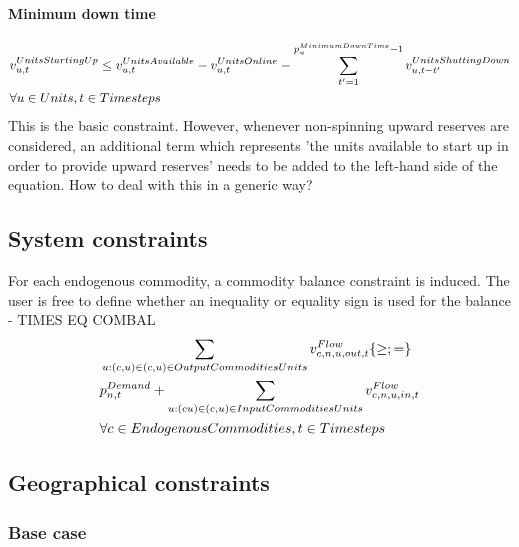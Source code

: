 \paragraph{Minimum down time}
\begin{align} \label{eq:minimumdowntime}
&\vUnitsStartingUp \le \vUnitsAvailable - \vUnitsOnline - \sum_{\timestep'=1}^{\pMinimumDownTime - 1} \vUnitsShuttingDown[\unit,\timestep-\timestep'] \nonumber \\
& \forall \units, \timesteps
\end{align}
{\color{red} This is the basic constraint. However, whenever non-spinning upward reserves are considered, an additional term which represents 'the units available to start up in order to provide upward reserves' needs to be added to the left-hand side of the equation. How to deal with this in a generic way?}






\subsection{System constraints}

For each endogenous commodity, a commodity balance constraint is induced. The user is free to define whether an inequality or equality sign is used for the balance - TIMES EQ COMBAL
\begin{align} \label{eq:commodity_balance}
&\sum_{\unit : (\commodity,\unit) \in \OutputCommoditiesUnits} \vFlow[\commodity,\node,\unit,out,\timestep] \{\ge;=\} \nonumber \\
&\pDemand + \sum_{\unit: (\commodity\unit) \in \InputCommoditiesUnits} \vFlow[\commodity,\node,\unit,in,\timestep] \nonumber \\
& \forall \EndogenousCommodities, \timesteps
\end{align}

\subsection{Geographical constraints}
\subsubsection{Base case}


